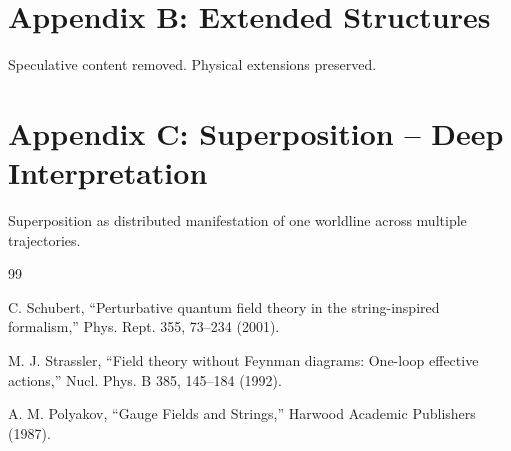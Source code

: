 \documentclass[12pt]{article}
\begin{document}
\section*{Appendix B: Extended Structures}
Speculative content removed. Physical extensions preserved.

\section*{Appendix C: Superposition – Deep Interpretation}
Superposition as distributed manifestation of one worldline across multiple trajectories.

\begin{thebibliography}{99}

C. Schubert, “Perturbative quantum field theory in the string-inspired formalism,”
Phys. Rept. 355, 73–234 (2001).

M. J. Strassler, “Field theory without Feynman diagrams: One-loop effective actions,”
Nucl. Phys. B 385, 145–184 (1992).

A. M. Polyakov, “Gauge Fields and Strings,” Harwood Academic Publishers (1987).

\end{thebibliography}
\end{document}
